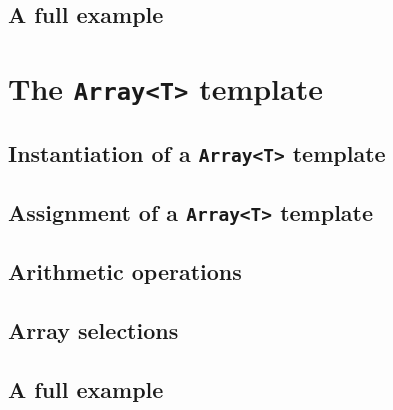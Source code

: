 \subsection{A full example}

\section{The {\tt Array<T>} template}

\subsection{Instantiation of a {\tt Array<T>} template}

\subsection{Assignment of a {\tt Array<T>} template}

\subsection{Arithmetic operations}

\subsection{Array selections}

\subsection{A full example}